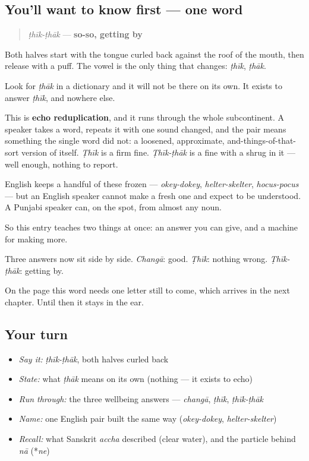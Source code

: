 \subsection*{You'll want to know first — one word}
\begin{quote}
\emph{ṭhīk-ṭhāk} — \textbf{so-so, getting by}
\end{quote}

Both halves start with the tongue curled back against the roof of the mouth, then release with a puff. The vowel is the only thing that changes: \emph{ṭhīk}, \emph{ṭhāk}.

\begin{cousinweb}
Look for \emph{ṭhāk} in a dictionary and it will not be there on its own. It exists to answer \emph{ṭhīk}, and nowhere else.

This is \textbf{echo reduplication}, and it runs through the whole subcontinent. A speaker takes a word, repeats it with one sound changed, and the pair means something the single word did not: a loosened, approximate, and-things-of-that-sort version of itself. \emph{Ṭhīk} is a firm fine. \emph{Ṭhīk-ṭhāk} is a fine with a shrug in it — well enough, nothing to report.

English keeps a handful of these frozen — \emph{okey-dokey}, \emph{helter-skelter}, \emph{hocus-pocus} — but an English speaker cannot make a fresh one and expect to be understood. A Punjabi speaker can, on the spot, from almost any noun.

So this entry teaches two things at once: an answer you can give, and a machine for making more.

Three answers now sit side by side. \emph{Changā}: good. \emph{Ṭhīk}: nothing wrong. \emph{Ṭhīk-ṭhāk}: getting by.

On the page this word needs one letter still to come, which arrives in the next chapter. Until then it stays in the ear.
\end{cousinweb}

\subsection*{Your turn}
\begin{itemize}
\raggedright
  \item \emph{Say it:} \emph{ṭhīk-ṭhāk}, both halves curled back
  \item \emph{State:} what \emph{ṭhāk} means on its own (nothing — it exists to echo)
  \item \emph{Run through:} the three wellbeing answers — \emph{changā}, \emph{ṭhīk}, \emph{ṭhīk-ṭhāk}
  \item \emph{Name:} one English pair built the same way (\emph{okey-dokey}, \emph{helter-skelter})
  \item \emph{Recall:} what Sanskrit \emph{accha} described (clear water), and the particle behind \emph{nā} (*\emph{ne})
\end{itemize}

